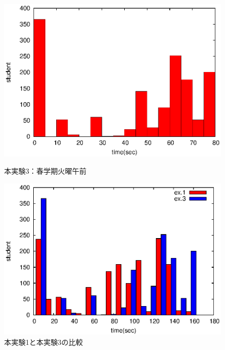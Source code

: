 \documentclass[a4paper,10pt]{jarticle}
\begin{document}
\begin{figure}[htpb]                        
\begin{minipage} {0.5\hsize}                             
\begin{center}                              
\includegraphics[bb=0 0 390 248,clip,width=\hsize]{oTu12_2_hist.eps}   
\caption{本実験3：春学期火曜午前}                              
\label{oTu12_2}                                
\end{center}                                    
\end{minipage}                                 
\begin{minipage}{0.5\hsize}                                            
\begin{center}                              
\includegraphics[bb=0 0 390 248,clip,width=\hsize]{otukarehist.eps}   
\caption{本実験1と本実験3の比較}                              
\label{otukaresan}                                
\end{center}                                    
\end{minipage}                                 
\end{figure}                                 
\end{document}
